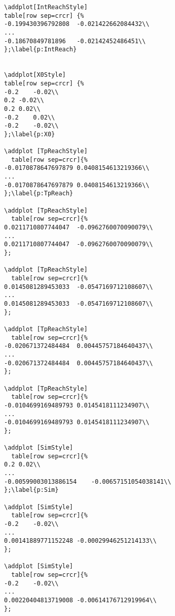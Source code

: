 \begin{verbatim}
\addplot[IntReachStyle]
table[row sep=crcr] {%
-0.199430396792808	-0.021422662084432\\
...
-0.18670849781896	-0.02142452486451\\
};\label{p:IntReach}


\addplot[X0Style]
table[row sep=crcr] {%
-0.2	-0.02\\
0.2	-0.02\\
0.2	0.02\\
-0.2	0.02\\
-0.2	-0.02\\
};\label{p:X0}

\addplot [TpReachStyle]
  table[row sep=crcr]{%
-0.0170878647697879	0.0408154613219366\\
...
-0.0170878647697879	0.0408154613219366\\
};\label{p:TpReach}

\addplot [TpReachStyle]
  table[row sep=crcr]{%
0.0211710807744047	-0.0962760070090079\\
...
0.0211710807744047	-0.0962760070090079\\
};

\addplot [TpReachStyle]
  table[row sep=crcr]{%
0.0145081289453033	-0.0547169712108607\\
...
0.0145081289453033	-0.0547169712108607\\
};

\addplot [TpReachStyle]
  table[row sep=crcr]{%
-0.020671372484484	0.00445757184640437\\
...
-0.020671372484484	0.00445757184640437\\
};

\addplot [TpReachStyle]
  table[row sep=crcr]{%
-0.0104699169489793	0.0145418111234907\\
...
-0.0104699169489793	0.0145418111234907\\
};

\addplot [SimStyle]
  table[row sep=crcr]{%
0.2	0.02\\
...
-0.00599003013886154	-0.00657151054038141\\
};\label{p:Sim}

\addplot [SimStyle]
  table[row sep=crcr]{%
-0.2	-0.02\\
...
0.00141889771152248	-0.00029946251214133\\
};

\addplot [SimStyle]
  table[row sep=crcr]{%
-0.2	-0.02\\
...
0.00220404813719008	-0.00614176712919964\\
};



\end{verbatim}
